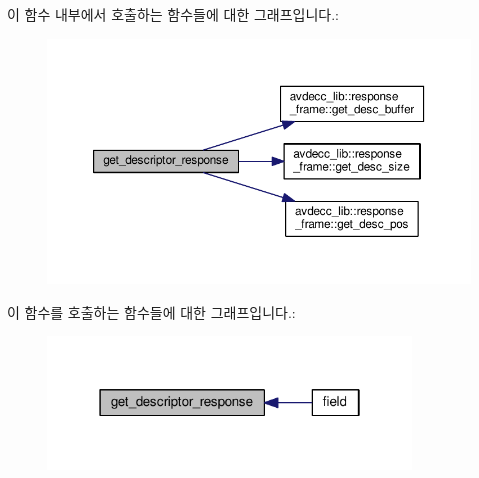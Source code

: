이 함수 내부에서 호출하는 함수들에 대한 그래프입니다.\+:
\nopagebreak
\begin{figure}[H]
\begin{center}
\leavevmode
\includegraphics[width=350pt]{classavdecc__lib_1_1descriptor__base__imp_a8c64c9df60afbc144cf24eab5a42c009_cgraph}
\end{center}
\end{figure}




이 함수를 호출하는 함수들에 대한 그래프입니다.\+:
\nopagebreak
\begin{figure}[H]
\begin{center}
\leavevmode
\includegraphics[width=274pt]{classavdecc__lib_1_1descriptor__base__imp_a8c64c9df60afbc144cf24eab5a42c009_icgraph}
\end{center}
\end{figure}


